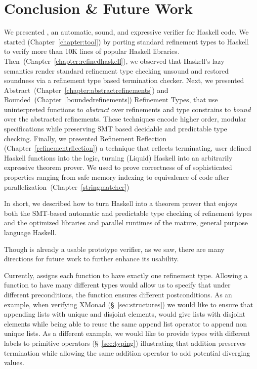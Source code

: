 \chapter{Conclusion \& Future Work}\label{chapter:conclusion}
\label{future:fp}
\label{future:intersection}
\label{future:proofautomation}
\label{future:continuations}
\label{future:gradual}
\label{future:errorreporting}
\label{future:ghost}

We presented \toolname, an automatic, sound, and expressive verifier for Haskell code. 
%
We started (Chapter~\ref{chapter:tool}) by porting standard refinement types 
to Haskell to verify more than 10K lines of popular Haskell libraries. 
%
Then~(Chapter~\ref{chapter:refinedhaskell}), we observed that Haskell's 
lazy semantics render standard refinement type checking unsound
and restored soundness via a refinement type based termination checker.
%
Next, we presented Abstract~(Chapter~\ref{chapter:abstractrefinements}) 
and Bounded~(Chapter~\ref{boundedrefinements}) Refinement Types, 
that use uninterpreted functions to 
\textit{abstract} over refinements
and type constrains to \textit{bound} over the abstracted refinements. 
These techniques encode higher order, modular specifications
while preserving SMT based decidable and predictable type checking. 
%
Finally, we presented Refinement Reflection (Chapter~\ref{refinementrflection})
a technique that reflects terminating, user defined 
Haskell functions into the logic, 
turning (Liquid) Haskell into an arbitrarily expressive 
theorem prover. 
%
We used \toolname to prove correctness of 
of sophisticated properties ranging from 
safe memory indexing to equivalence of code after parallelization~(Chapter~\ref{stringmatcher})

In short, we described how to turn Haskell into a theorem prover
that enjoys both 
the SMT-based automatic and predictable type checking
of refinement types
and 
the optimized libraries and parallel runtimes of 
the mature, general purpose language Haskell.

Though \toolname is already a usable prototype verifier, 
as we saw, there are many directions for future work
to further enhance its usability.

Currently, \toolname assigns each function to have exactly one refinement type. 
Allowing a function to have many different types would allow us to specify 
that under different preconditions, the function ensures different postconditions. 
%
As an example, 
when verifying XMonad (\S~\ref{sec:structures})
we would like to ensure that appending lists with unique and disjoint elements, 
would give lists with disjoint elements
while being able to reuse the same append list operator to append non unique lists. 
%
As a different example, we would like to provide types 
with different labels 
to primitive operators (\S~\ref{sec:typing})
illustrating that addition preserves termination while 
allowing the same addition operator to add potential diverging values. 
%

